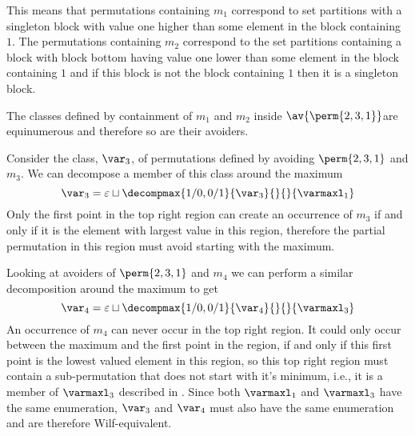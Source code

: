 This means that permutations containing \(m_1\) correspond to set partitions
with a singleton block with value one higher than some element in the
block containing \(1\). The permutations containing \(m_2\) correspond
to the set partitions containing a block with block bottom having value
one lower than some element in the block containing \(1\) and if this
block is not the block containing \(1\) then it is a singleton block.

The classes defined by containment of \(m_1\) and \(m_2\) inside \(\av{\perm{2,3,1}}\)are
equinumerous and therefore so are their avoiders.

Consider the class, \(\scriptvar_3\), of permutations defined by avoiding \(\perm{2,3,1}\) and \(m_3\). We can decompose a member of this class around the maximum
\begin{equation*}
    \scriptvar_3 = \varepsilon \sqcup
    \decompmax{1/0,0/1}{\scriptvar_3}{}{}{\mathcal{\varmaxl}_1}
\end{equation*}
Only the first point in the top right region can
create an occurrence of \(m_3\) if and only if it is the
element with largest value in this region, therefore the partial permutation
in this region must avoid starting with the maximum.

Looking at avoiders of \(\perm{2,3,1}\) and \(m_4\) we
can perform a similar decomposition around the maximum to get
\begin{equation*}
    \scriptvar_4 = \varepsilon \sqcup
    \decompmax{1/0,0/1}{\scriptvar_4}{}{}{\mathcal{\varmaxl}_3}
\end{equation*}
An occurrence of \(m_4\) can never occur in the
top right region. It could only occur between the maximum and the first point
in the region, if and only if this first point is the lowest valued element in
this region, so this top right region must contain a sub-permutation that does not
start with it's minimum, i.e., it is a member of \(\mathcal{\varmaxl}_3\) described
in .
Since both \(\mathcal{\varmaxl}_1\) and \(\mathcal{\varmaxl}_3\) have the same
enumeration, \(\scriptvar_3\) and \(\scriptvar_4\) must also have
the same enumeration and are therefore Wilf-equivalent.

